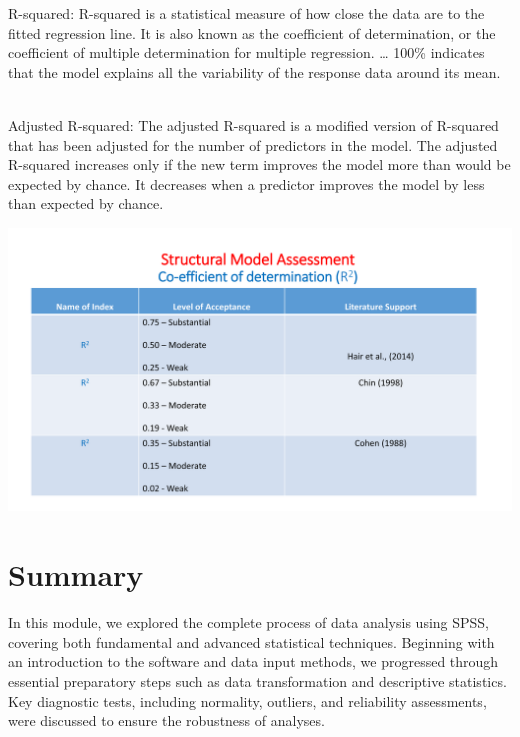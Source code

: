 \documentclass[
  letterpaper,
  DIV=11,
  numbers=noendperiod]{scrreprt}
\begin{document}
\begin{tcolorbox}[enhanced jigsaw, rightrule=.15mm, arc=.35mm, colframe=quarto-callout-note-color-frame, coltitle=black, left=2mm, colbacktitle=quarto-callout-note-color!10!white, bottomtitle=1mm, titlerule=0mm, colback=white, breakable, opacitybacktitle=0.6, opacityback=0, toprule=.15mm, toptitle=1mm, title=\textcolor{quarto-callout-note-color}{\faInfo}\hspace{0.5em}{R-Squired \& Adjusted R-Squired}, bottomrule=.15mm, leftrule=.75mm]

{R-squared:} {R-squared is a statistical measure of how close the data
are to the fitted regression line. It is also known as the coefficient
of determination, or the coefficient of multiple determination for
multiple regression. \ldots{} 100\% indicates that the model explains
all the variability of the response data around its mean.}\\
\strut \\
{Adjusted R-squared:} {The adjusted R-squared is a modified version of
R-squared that has been adjusted for the number of predictors in the
model. The adjusted R-squared increases only if the new term improves
the model more than would be expected by chance. It decreases when a
predictor improves the model by less than expected by chance.}

\end{tcolorbox}

\includegraphics{images/slides/img_Page_147.png}


\chapter{Summary}\label{summary}

In this module, we explored the complete process of data analysis using
SPSS, covering both fundamental and advanced statistical techniques.
Beginning with an introduction to the software and data input methods,
we progressed through essential preparatory steps such as data
transformation and descriptive statistics. Key diagnostic tests,
including normality, outliers, and reliability assessments, were
discussed to ensure the robustness of analyses.\\
\end{document}

